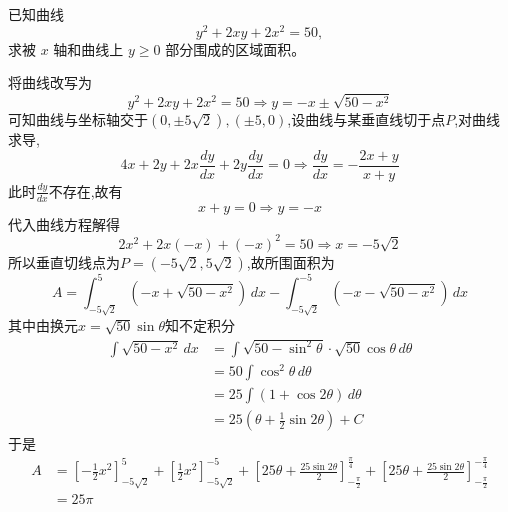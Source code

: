 \begin{questions}
    \question 已知曲线
    \[
    y^2 + 2xy + 2x^2 = 50,
    \]
    求被 $x$ 轴和曲线上 $y \ge 0$ 部分围成的区域面积。
    \begin{solution}
        将曲线改写为
        \[
        y^2 + 2xy + 2x^2 = 50 \Rightarrow y = -x \pm \sqrt{50-x^2}
        \]
        可知曲线与坐标轴交于$(0,\pm 5\sqrt{2}),(\pm5,0)$,设曲线与某垂直线切于点$P$,对曲线求导,
        \[
        4x + 2y + 2x\frac{dy}{dx} + 2y\frac{dy}{dx} = 0 \Rightarrow \frac{dy}{dx}=-\frac{2x+y}{x+y}
        \]
        此时$\frac{dy}{dx}$不存在,故有
        \[
        x+y = 0 \Rightarrow y=-x
        \]
        代入曲线方程解得
        \[
        2x^2 + 2x(-x) + (-x)^2 = 50 \Rightarrow x = - 5\sqrt{2}
        \]
        所以垂直切线点为$P = (-5\sqrt{2}, 5\sqrt{2})$,故所围面积为
        \[
        A=\int_{-5\sqrt{2}}^{5} (-x+\sqrt{50-x^2}) \, dx - \int_{-5\sqrt{2}}^{-5} (-x-\sqrt{50-x^2}) \, dx
        \]
        其中由换元$x = \sqrt{50}\sin \theta$知不定积分
        \begin{align*}
        \int \sqrt{50-x^2}\, dx 
        &= \int \sqrt{50-\sin^2 \theta} \cdot \sqrt{50} \cos \theta \, d\theta \\
        &= 50 \int \cos^2 \theta\,d\theta \\
        &= 25 \int (1+\cos 2\theta)\,d\theta \\
        &= 25 \left(\theta+\frac{1}{2}\sin 2\theta\right) +C
        \end{align*}
        于是
        \begin{align*}
        A &= \left[-\frac{1}{2}x^2\right]_{-5\sqrt{2}}^{5} + \left[\frac{1}{2}x^2\right]_{-5\sqrt{2}}^{-5} + \left[25\theta + \frac{25\sin 2\theta}{2}\right]_{-\frac{\pi}{2}}^{\frac{\pi}{4}} + \left[25\theta + \frac{25\sin 2\theta}{2}\right]_{-\frac{\pi}{2}}^{-\frac{\pi}{4}} \\
        &= 25\pi
        \end{align*}
    \end{solution}


\end{questions}
